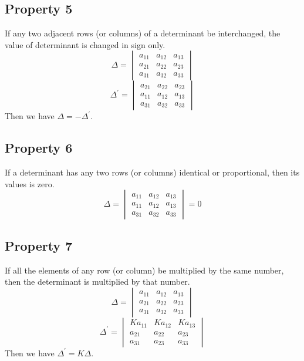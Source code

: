 \documentclass{article}
\begin{document}
\subsection*{Property 5}
If any two adjacent rows (or columns) of a
determinant be interchanged, the value of
determinant is changed in sign only.
\begin{equation*}
    \Delta=
    \begin{vmatrix}
        a_{11} & a_{12} & a_{13} \\
        a_{21} & a_{22} & a_{23} \\
        a_{31} & a_{32} & a_{33} 
    \end{vmatrix}
\end{equation*}
\begin{equation*}
    \Delta^{'}=
    \begin{vmatrix}
        a_{21} & a_{22} & a_{23} \\
        a_{11} & a_{12} & a_{13} \\
        a_{31} & a_{32} & a_{33} 
    \end{vmatrix}
\end{equation*}
Then we have $\Delta=-\Delta^{'}$.

\subsection*{Property 6}
If a determinant has any two rows (or columns) identical or proportional, then its values is zero.
\begin{equation*}
    \Delta=
    \begin{vmatrix}
        a_{11} & a_{12} & a_{13} \\
        a_{11} & a_{12} & a_{13} \\
        a_{31} & a_{32} & a_{33} 
    \end{vmatrix}
    =0
\end{equation*}
\subsection*{Property 7}
If all the elements of any row (or column) be
multiplied by the same number, then the determinant
is multiplied by that number.
\begin{equation*}
    \Delta=
    \begin{vmatrix}
        a_{11} & a_{12} & a_{13} \\
        a_{21} & a_{22} & a_{23} \\
        a_{31} & a_{32} & a_{33} 
    \end{vmatrix}
\end{equation*}
\begin{equation*}
    \Delta^{'}=
    \begin{vmatrix}
        Ka_{11} & Ka_{12} & Ka_{13} \\
        a_{21} & a_{22} & a_{23} \\
        a_{31} & a_{23} & a_{33} 
    \end{vmatrix}
\end{equation*}
Then we have $\Delta^{'}=K\Delta$.
\end{document}
